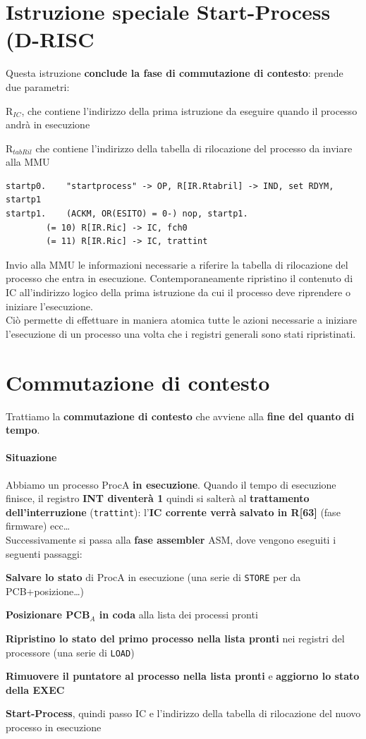 \documentclass[10pt]{report}
\begin{document}
\section{Istruzione speciale Start-Process (D-RISC}
Questa istruzione \textbf{conclude la fase di commutazione di contesto}: prende due parametri:
\begin{list}{}{}
	\item R$_{IC}$, che contiene l'indirizzo della prima istruzione da eseguire quando il processo andrà in esecuzione
	\item R$_{tabRil}$ che contiene l'indirizzo della tabella di rilocazione del processo da inviare alla MMU
\end{list}
\begin{lstlisting}
startp0.	"startprocess" -> OP, R[IR.Rtabril] -> IND, set RDYM, startp1
startp1.	(ACKM, OR(ESITO) = 0-) nop, startp1.
		(= 10) R[IR.Ric] -> IC, fch0
		(= 11) R[IR.Ric] -> IC, trattint
\end{lstlisting}
Invio alla MMU le informazioni necessarie a riferire la tabella di rilocazione del processo che entra in esecuzione. Contemporaneamente ripristino il contenuto di IC all'indirizzo logico della prima istruzione da cui il processo deve riprendere o iniziare l'esecuzione.\\
Ciò permette di effettuare in maniera atomica tutte le azioni necessarie a iniziare l'esecuzione di un processo una volta che i registri generali sono stati ripristinati.
\section{Commutazione di contesto}
Trattiamo la \textbf{commutazione di contesto} che avviene alla \textbf{fine del quanto di tempo}.
\paragraph{Situazione} Abbiamo un processo ProcA \textbf{in esecuzione}. Quando il tempo di esecuzione finisce, il registro \textbf{INT diventerà 1} quindi si salterà al \textbf{trattamento dell'interruzione} (\texttt{trattint}): l'\textbf{IC corrente verrà salvato in R[63]} (fase firmware) ecc\ldots\\
Successivamente si passa alla \textbf{fase assembler} ASM, dove vengono eseguiti i seguenti passaggi:
\begin{list}{}{}
	\item \textbf{Salvare lo stato} di ProcA in esecuzione (una serie di \texttt{STORE} per da PCB+posizione\ldots)
	\item \textbf{Posizionare PCB$_A$ in coda} alla lista dei processi pronti
	\item \textbf{Ripristino lo stato del primo processo nella lista pronti} nei registri del processore (una serie di \texttt{LOAD})
	\item \textbf{Rimuovere il puntatore al processo nella lista pronti} e \textbf{aggiorno lo stato della EXEC}
	\item \textbf{Start-Process}, quindi passo IC e l'indirizzo della tabella di rilocazione del nuovo processo in esecuzione
\end{list}
\end{document}
